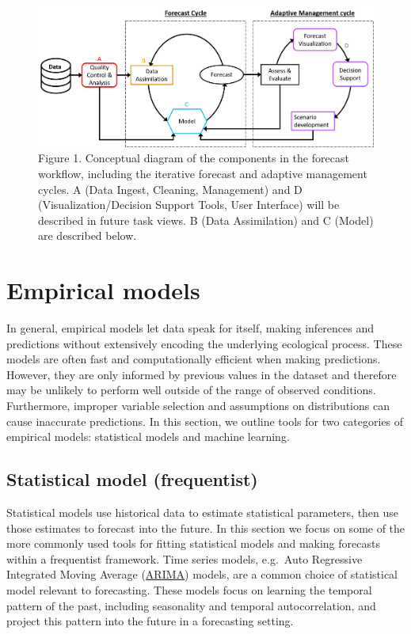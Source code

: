 \documentclass[
]{book}
\begin{document}
\begin{figure}
\centering
\includegraphics{images/Fig1_StatsMethodsUncertaintyTaskView.png}
\caption{Figure 1. Conceptual diagram of the components in the forecast workflow, including the iterative forecast and adaptive management cycles. A (Data Ingest, Cleaning, Management) and D (Visualization/Decision Support Tools, User Interface) will be described in future task views. B (Data Assimilation) and C (Model) are described below.}
\end{figure}

\hypertarget{empirical-models}{%
\section{Empirical models}\label{empirical-models}}

In general, empirical models let data speak for itself, making inferences and predictions without extensively encoding the underlying ecological process. These models are often fast and computationally efficient when making predictions. However, they are only informed by previous values in the dataset and therefore may be unlikely to perform well outside of the range of observed conditions. Furthermore, improper variable selection and assumptions on distributions can cause inaccurate predictions. In this section, we outline tools for two categories of empirical models: statistical models and machine learning.

\hypertarget{statistical-model-frequentist}{%
\subsection{Statistical model (frequentist)}\label{statistical-model-frequentist}}

Statistical models use historical data to estimate statistical parameters, then use those estimates to forecast into the future. In this section we focus on some of the more commonly used tools for fitting statistical models and making forecasts within a frequentist framework. Time series models, e.g.~Auto Regressive Integrated Moving Average (\href{https://en.wikipedia.org/wiki/Autoregressive_integrated_moving_average}{ARIMA}) models, are a common choice of statistical model relevant to forecasting. These models focus on learning the temporal pattern of the past, including seasonality and temporal autocorrelation, and project this pattern into the future in a forecasting setting.
\end{document}

